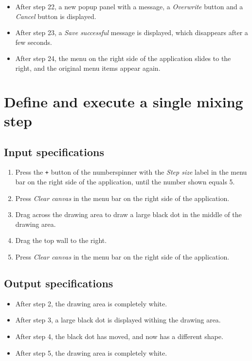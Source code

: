 \begin{itemize}
\item After step 22, a new popup panel with a message, a \emph{Overwrite} button and a \emph{Cancel} button is displayed.
\item After step 23, a \emph{Save successful} message is displayed, which disappears after a few seconds.
\item After step 24, the menu on the right side of the application slides to the right, and the original menu items appear again.
\end{itemize}

\section{Define and execute a single mixing step}

\subsection*{Input specifications}
\begin{enumerate}
\item Press the \texttt{+} button of the numberspinner with the \emph{Step size} label in the menu bar on the right side of the application, until the number shown equals 5.
\item Press \emph{Clear canvas} in the menu bar on the right side of the application. 
\item Drag across the drawing area to draw a large black dot in the middle of the drawing area.
\item Drag the top wall to the right.
\item Press \emph{Clear canvas} in the menu bar on the right side of the application. 
\end{enumerate}

\subsection*{Output specifications}
\begin{itemize}
\item After step 2, the drawing area is completely white.
\item After step 3, a large black dot is displayed withing the drawing area.
\item After step 4, the black dot has moved, and now has a different shape.
\item After step 5, the drawing area is completely white.
\end{itemize}

